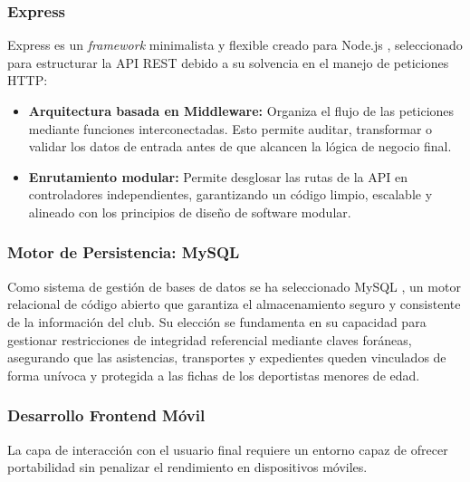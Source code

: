\subsubsection{Express}
Express es un \textit{framework} minimalista y flexible creado para Node.js \cite{ExpressJS}, seleccionado para estructurar la API REST debido a su solvencia en el manejo de peticiones HTTP:
\begin{itemize}
    \item \textbf{Arquitectura basada en Middleware:} Organiza el flujo de las peticiones mediante funciones interconectadas. Esto permite auditar, transformar o validar los datos de entrada antes de que alcancen la lógica de negocio final.
    \item \textbf{Enrutamiento modular:} Permite desglosar las rutas de la API en controladores independientes, garantizando un código limpio, escalable y alineado con los principios de diseño de software modular.
\end{itemize}

\subsubsection{Motor de Persistencia: MySQL}
Como sistema de gestión de bases de datos se ha seleccionado MySQL \cite{MySQL}, un motor relacional de código abierto que garantiza el almacenamiento seguro y consistente de la información del club. Su elección se fundamenta en su capacidad para gestionar restricciones de integridad referencial mediante claves foráneas, asegurando que las asistencias, transportes y expedientes queden vinculados de forma unívoca y protegida a las fichas de los deportistas menores de edad.

\subsubsection{Desarrollo Frontend Móvil}
La capa de interacción con el usuario final requiere un entorno capaz de ofrecer portabilidad sin penalizar el rendimiento en dispositivos móviles.


